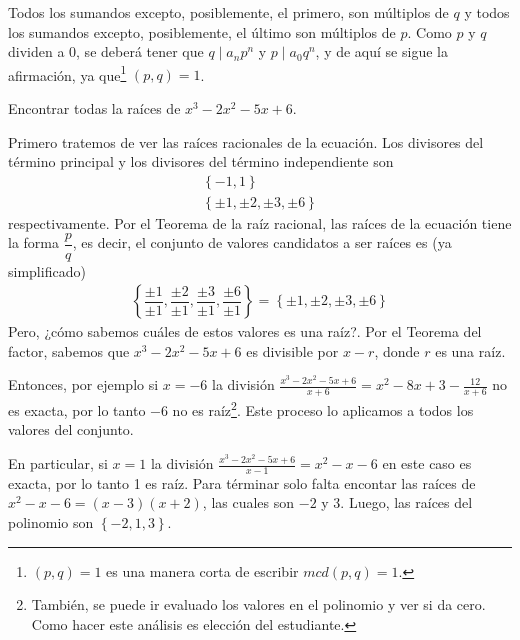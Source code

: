 Todos los sumandos excepto, posiblemente, el primero, son múltiplos de $q$ y todos los sumandos excepto, posiblemente, el último son múltiplos de $p$.
Como $p$ y $q$ dividen a 0, se deberá tener que $q \mid a_n p^n$ y $p \mid a_0 q^n$, y de aquí se sigue la afirmación, ya que\footnote{$(p, q) =  1$ es una manera corta de escribir $mcd(p, q) = 1$.} $(p, q) = 1$.


\begin{example}
    Encontrar todas la raíces de $x^3 - 2x^2 - 5x + 6$.
    
    \begin{solution}
        Primero tratemos de ver las raíces racionales de la ecuación.
        Los divisores del término principal y los divisores del término independiente son
        \begin{gather*}
            \left\{ -1, 1 \right\}\\
            \left\{ \pm 1, \pm 2, \pm 3, \pm6 \right\}
        \end{gather*}
        respectivamente.
        Por el Teorema de la raíz racional, las raíces de la ecuación tiene la forma $\dfrac{p}{q}$, es decir, el conjunto de valores candidatos a ser raíces es (ya simplificado)
        \begin{gather*}
            \left\{ \dfrac{\pm 1}{\pm 1}, \dfrac{\pm 2}{\pm 1}, \dfrac{\pm 3}{\pm 1}, \dfrac{\pm 6}{\pm 1} \right\} =
            \left\{ \pm 1, \pm 2, \pm 3, \pm 6 \right\}
        \end{gather*}
        Pero, ¿cómo sabemos cuáles de estos valores es una raíz?.
        Por el Teorema del factor, sabemos que $x^3 - 2x^2 - 5x + 6$ es divisible por $x - r$, donde $r$ es una raíz.

        Entonces, por ejemplo si $x = -6$ la división $\frac{x^3 - 2x^2 - 5x + 6}{x + 6} = x^2 - 8x + 3 - \frac{12}{x + 6}$ no es exacta, por lo tanto $-6$ no es raíz\footnote
        {También, se puede ir evaluado los valores en el polinomio y ver si da cero. Como hacer este análisis es elección del estudiante.}.
        Este proceso lo aplicamos a todos los valores del conjunto.

        En particular, si $x = 1$ la división $\frac{x^3 - 2x^2 - 5x + 6}{x - 1} = x^2 - x - 6$ en este caso es exacta, por lo tanto 1 es raíz.
        Para términar solo falta encontar las raíces de $x^2 - x - 6 = (x - 3)(x + 2)$, las cuales son $-2$ y 3.
        Luego, las raíces del polinomio son $\left\{ -2, 1, 3 \right\}$.
    \end{solution}
\end{example}

